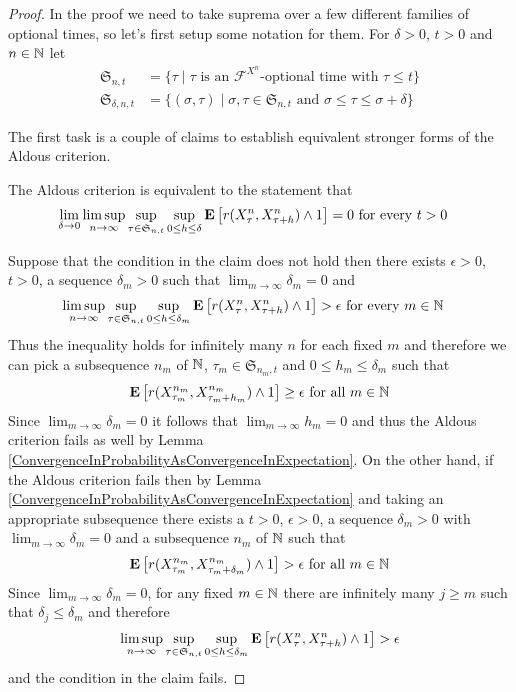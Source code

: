 \begin{proof}
In the proof we need to take suprema over a few different families of optional times, so let's first setup some notation for them.
For $\delta > 0$, $t > 0$ and $n \in \mathbb{N}$ let
\begin{align*}
\mathfrak{S}_{n,t} &= 
\lbrace \tau \mid \tau \text{ is an $\mathcal{F}^{X^n}$-optional time with $\tau \leq t$} \rbrace \\
\mathfrak{S}_{\delta,n,t} &= 
\lbrace (\sigma, \tau) \mid \sigma, \tau \in \mathfrak{S}_{n,t} \text{ and } \sigma \leq \tau \leq \sigma + \delta \rbrace 
\end{align*}

The first task is a couple of claims to establish equivalent stronger forms of the Aldous criterion.
\begin{clm}The Aldous criterion is equivalent to the statement that
\begin{align*}
\lim_{\delta \to 0} \limsup_{n \to \infty} \sup_{\tau \in \mathfrak{S}_{n,t}} \sup_{0\leq h \leq \delta} \textbf{E}\left[r(X^n_\tau, X^n_{\tau+h}) \wedge  1\right] &= 0 \text{ for every $t > 0$}
\end{align*}
\end{clm}
Suppose that the condition in the claim does not hold then there exists $\epsilon > 0$, $t>0$, a sequence $\delta_m > 0$ such that $\lim_{m \to \infty} \delta_m = 0$ and \begin{align*}
\limsup_{n \to \infty} \sup_{\tau \in \mathfrak{S}_{n,t}} \sup_{0\leq h \leq \delta_m} \textbf{E}\left[r(X^n_\tau, X^n_{\tau+h}) \wedge  1\right] &> \epsilon \text{ for every $m \in \mathbb{N}$}
\end{align*}
Thus the inequality holds for infinitely many $n$ for each fixed $m$ and therefore we can pick a subsequence $n_m$ of $\mathbb{N}$, $\tau_{m} \in \mathfrak{S}_{n_m,t}$ and $0 \leq h_{m} \leq \delta_m$ such that
\begin{align*}
\textbf{E}\left[r(X^{n_m}_{\tau_{m}}, X^{n_m}_{\tau_{m} + h_{m}}) \wedge  1\right] \geq \epsilon \text{ for all $m \in \mathbb{N}$}
\end{align*}
Since $\lim_{m \to \infty} \delta_m = 0$ it follows that $\lim_{m \to \infty} h_m = 0$ and thus the Aldous criterion fails as well by Lemma \ref{ConvergenceInProbabilityAsConvergenceInExpectation}. On the other hand, if the Aldous criterion fails then by Lemma \ref{ConvergenceInProbabilityAsConvergenceInExpectation} and taking an appropriate subsequence
there exists a $t > 0$, $\epsilon > 0$, a sequence $\delta_m>0$ with $\lim_{m \to \infty} \delta_m= 0$ and a subsequence $n_m$ of $\mathbb{N}$ such that
\begin{align*}
\textbf{E}\left[r(X^{n_m}_{\tau_m}, X^{n_m}_{\tau_m + \delta_m})  \wedge 1\right] > \epsilon \text{ for all $m \in \mathbb{N}$}
\end{align*}
Since $\lim_{m \to \infty} \delta_m= 0$, for any fixed $m \in \mathbb{N}$ there are infinitely many $j \geq m$ such that $\delta_j \leq \delta_m$ and therefore
\begin{align*}
\limsup_{n \to \infty} \sup_{\tau \in \mathfrak{S}_{n,t}} \sup_{0\leq h \leq \delta_m} \textbf{E}\left[r(X^n_\tau, X^n_{\tau+h}) \wedge  1\right] >\epsilon
\end{align*}
and the condition in the claim fails.


\end{proof}
